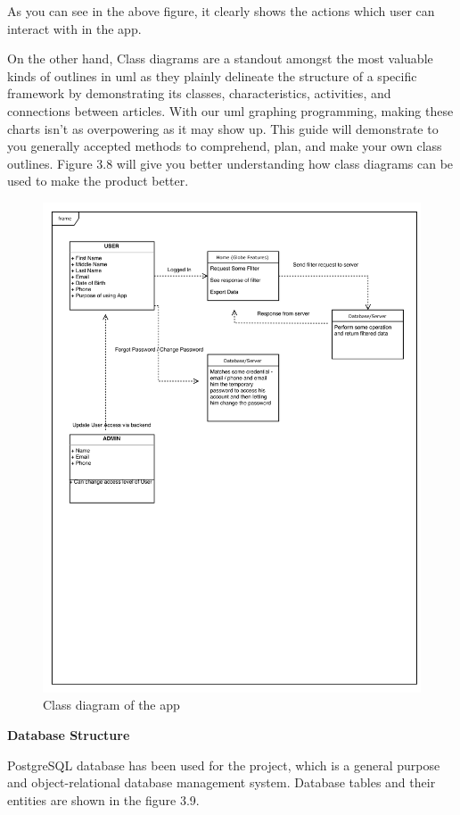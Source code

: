 As you can see in the above figure, it clearly shows the actions which user can interact with in the app.

On the other hand, Class diagrams are a standout amongst the most valuable kinds of outlines in \gls{uml} as they plainly delineate the structure of a specific framework by demonstrating its classes, characteristics, activities, and connections between articles. With our  \gls{uml} graphing programming, making these charts isn't as overpowering as it may show up. This guide will demonstrate to you generally accepted methods to comprehend, plan, and make your own class outlines. Figure 3.8 will give you better understanding how class diagrams can be used to make the product better.

    \begin{figure}[H]
            \centering
            \includegraphics[width=0.8\linewidth]{figures/ch3/classdiagram.png}
            \caption{\label{fig:wireframe_3} Class diagram of the app}
    \end{figure}
    
    \newpage

 \centerline{\textbf{Database Structure}}    
  PostgreSQL database has been used for the project, which is a general purpose and object-relational database management system. 
  Database tables and their entities are shown in the figure 3.9.
  
